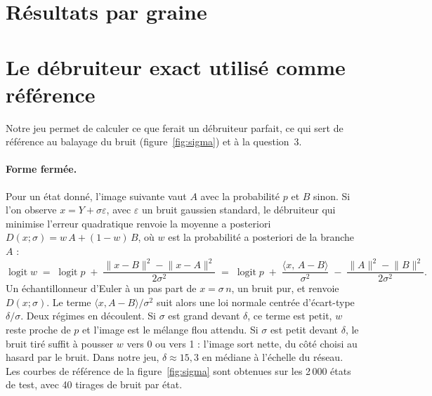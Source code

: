 \documentclass[a4paper, 11pt]{article}
\newcommand{\phat}{\hat p}
\begin{document}
\section{Résultats par graine}\label{app:graines}

\begin{table}[H]
  \centering\footnotesize\setlength{\tabcolsep}{4pt}
  
  \caption{Mesures par graine pour le c\oe ur de l'étude ($p = 0{,}3$, 2\,000 états de test). L'intervalle de confiance de
  $\phat$ est l'intervalle binomial exact de Clopper-Pearson à 95~\%. Pour la régression, $\phat$ n'est pas donné, faute d'images nettes en nombre
  suffisant.}
  \label{tab:graines}
\end{table}

\section{Le débruiteur exact utilisé comme référence}\label{app:exact}

Notre jeu permet de calculer ce que ferait un débruiteur parfait, ce qui sert de référence au balayage du bruit
(figure~\ref{fig:sigma}) et à la question~3.

\paragraph{Forme fermée.} Pour un état donné, l'image suivante vaut $A$ avec la probabilité $p$ et $B$ sinon. Si l'on observe
$x = Y + \sigma\varepsilon$, avec $\varepsilon$ un bruit gaussien standard, le débruiteur qui minimise l'erreur quadratique
renvoie la moyenne a posteriori $D(x;\sigma) = w\,A + (1-w)\,B$, où $w$ est la probabilité a posteriori de la branche $A$ :
\begin{equation}
  \operatorname{logit} w \;=\; \operatorname{logit} p \;+\; \frac{\lVert x - B\rVert^2 - \lVert x - A\rVert^2}{2\sigma^2}
  \;=\; \operatorname{logit} p \;+\; \frac{\langle x,\, A - B\rangle}{\sigma^2} \;-\; \frac{\lVert A\rVert^2 - \lVert B\rVert^2}{2\sigma^2}.
\end{equation}
Un échantillonneur d'Euler à un pas part de $x = \sigma\,n$, un bruit pur, et renvoie $D(x;\sigma)$. Le terme
$\langle x, A-B\rangle/\sigma^2$ suit alors une loi normale centrée d'écart-type $\delta/\sigma$. Deux régimes en découlent. Si
$\sigma$ est grand devant $\delta$, ce terme est petit, $w$ reste proche de $p$ et l'image est le mélange flou attendu. Si $\sigma$
est petit devant $\delta$, le bruit tiré suffit à pousser $w$ vers 0 ou vers 1 : l'image sort nette, du côté choisi au hasard par
le bruit. Dans notre jeu, $\delta \approx 15{,}3$ en médiane à l'échelle du réseau. Les courbes de référence de la
figure~\ref{fig:sigma} sont obtenues sur les 2\,000 états de test, avec 40 tirages de bruit par état.
\end{document}
